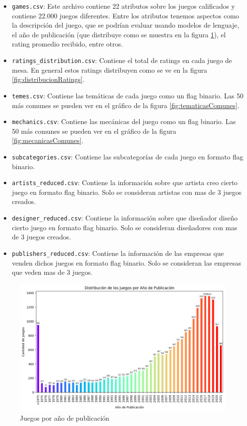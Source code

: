 \documentclass[11pt]{article}
\begin{document}
\begin{itemize}
    \item \texttt{games.csv}: Este archivo contiene 22 atributos sobre los juegos calificados y contiene 22.000 juegos diferentes. Entre los atributos tenemos aspectos como la descripción del juego, que se podrían evaluar usando modelos de lenguaje, el año de publicación (que distribuye como se muestra en la figura \ref{fig:publishYear}), el rating promedio recibido, entre otros.
    \item \texttt{ratings\_distribution.csv}: Contiene el total de ratings en cada juego de mesa. En general estos ratings distribuyen como se ve en la figura \ref{fig:distribucionRatings}.
    \item \texttt{temes.csv}: Contiene las temáticas de cada juego como un flag binario. Las 50 más comunes se pueden ver en el gráfico de la figura \ref{fig:tematicasComunes}.
    \item \texttt{mechanics.csv}: Contiene las mecánicas del juego como un flag binario. Las 50 más comunes se pueden ver en el gráfico de la figura \ref{fig:mecanicasComunes}.
    \item \texttt{subcategories.csv}: Contiene las subcategorías de cada juego en formato flag binario.
    \item \texttt{artists\_reduced.csv}: Contiene la información sobre que artista creo cierto juego en formato flag binario. Solo se consideran artistas con mas de 3 juegos creados.
    \item \texttt{designer\_reduced.csv}: Contiene la información sobre que diseñador diseño cierto juego en formato flag binario. Solo se consideran diseñadores con mas de 3 juegos creados.
    \item \texttt{publishers\_reduced.csv}: Contiene la información de las empresas que venden dichos juegos en formato flag binario. Solo se consideran las empresas que veden mas de 3 juegos.
    
\end{itemize}

\begin{figure}
    \centering
    \includegraphics[width=0.8\linewidth]{publishYear.png}
    \caption{Juegos por año de publicación}
    \label{fig:publishYear}
\end{figure}
\end{document}
